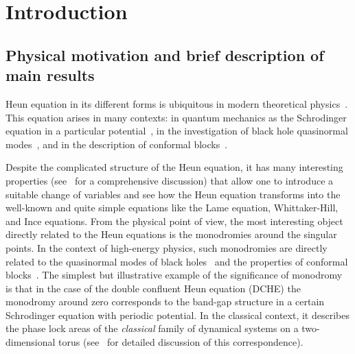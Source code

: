 \documentclass[preprint,12pt]{elsarticle}
\theoremstyle{plain}
\numberwithin{equation}{section}
\numberwithin{equation}{section}
\begin{document}
\maketitle

\newpage
\tableofcontents

\section{Introduction}

\subsection{Physical motivation and brief description of main results}

Heun equation in its different forms is ubiquitous in modern theoretical physics~\cite{hortaccsu2018heun}. This equation arises in many contexts: in quantum mechanics as the Schrodinger equation in a particular potential~\cite{ishkhanyan2016,figueiredo2024}, in the investigation of black hole quasinormal modes~\cite{fiziev2011application}, and in the description of conformal blocks~\cite{lisovyy2022perturbative}.

Despite the complicated structure of the Heun equation, it has many interesting properties (see~\cite{ronveaux1995heun,slavyanov-lay2000} for a comprehensive discussion) that allow one to introduce a suitable change of variables and see how the Heun equation transforms into the well-known and quite simple equations like the Lame equation, Whittaker-Hill, and Ince equations. From the physical point of view, the most interesting object directly related to the Heun equations is the monodromies around the singular points. In the context of high-energy physics, such monodromies are directly related to the quasinormal modes of black holes~\cite{hatsuda2020quasinormal,aminov2022black} and the properties of conformal blocks~\cite{litvinov2014classical}. The simplest but illustrative example of the significance of monodromy is that in the case of the double confluent Heun equation (DCHE) the monodromy around zero corresponds to the band-gap structure in a certain Schrodinger equation with periodic potential. In the classical context, it describes the phase lock areas of the \emph{classical} family of dynamical systems on a two-dimensional torus (see~\cite{alexandrov2025} for detailed discussion of this correspondence). 
\end{document}
